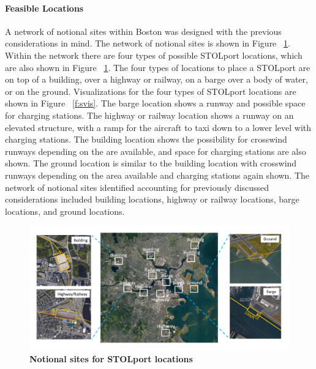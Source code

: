 \documentclass[]{aiaa-tc}%
\begin{document}
\paragraph{Feasible Locations}
A network of notional sites within Boston was designed with the previous considerations in mind. The network of notional sites is shown in Figure ~\ref{f:nsites}. Within the network there are four types of possible STOLport locations, which are also shown in Figure ~\ref{f:nsites}. The four types of locations to place a STOLport are on top of a building, over a highway or railway, on a barge over a body of water, or on the ground. Visualizations for the four types of STOLport locations are shown in Figure ~\ref{f:svis}. The barge location shows a runway and possible space for charging stations.  The highway or railway location shows a runway on an elevated structure, with a ramp for the aircraft to taxi down to a lower level with charging stations. The building location shows the possibility for crosswind runways depending on the are available, and space for charging stations are also shown. The ground location is similar to the building location with crosswind runways depending on the area available and charging stations again shown. The network of notional sites identified accounting for previously discussed considerations included building locations, highway or railway locations, barge locations, and ground locations.
\begin{figure}[h!]
	\begin{center}
	\includegraphics[width=1.0\textwidth]{2 Notional Sites.pdf}
    \caption{\textbf{Notional sites for STOLport locations}}
	\label{f:nsites}
	\end{center}
\end{figure}
\end{document}
